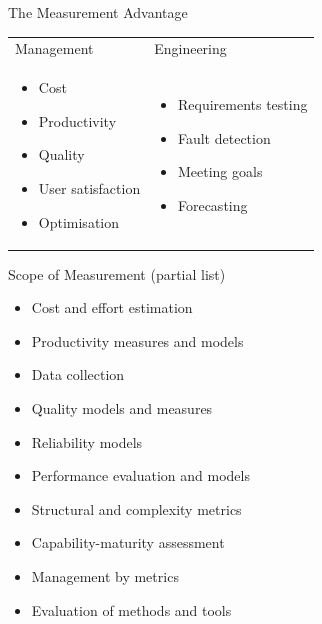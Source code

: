 \documentclass{beamer}
\begin{document}
\begin{frame}{\centerline{The Measurement Advantage}}

\begin{table}[H]

\begin{tabulary}{\textwidth}{m{5.5cm} m{5.5cm}}
Management &
Engineering \\

\begin{itemize}    
    \item Cost
    \item Productivity
    \item Quality
    \item User satisfaction
    \item Optimisation
\end{itemize} &
\begin{itemize}    
    \item Requirements testing
    \item Fault detection
    \item Meeting goals
    \item Forecasting
\end{itemize}
\end{tabulary}
\end{table}

\end{frame}

\begin{frame}{\centerline{Scope of Measurement (partial list)}}

\begin{itemize}
    \item Cost and effort estimation
    \item Productivity measures and models
    \item Data collection
    \item Quality models and measures
    \item Reliability models
    \item Performance evaluation and models
    \item Structural and complexity metrics
    \item Capability-maturity assessment
    \item Management by metrics
    \item Evaluation of methods and tools
\end{itemize}
\end{frame}
\end{document}
